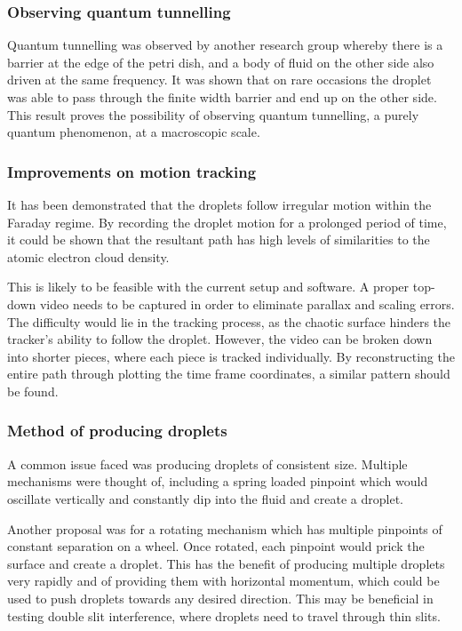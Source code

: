 \subsubsection{Observing quantum tunnelling}
Quantum tunnelling was observed by another research group \cite{brady2014bouncing} whereby there is a barrier at the edge of the petri dish, and a body of fluid on the other side also driven at the same frequency. It was shown that on rare occasions the droplet was able to pass through the finite width barrier and end up on the other side. This result proves the possibility of observing quantum tunnelling, a purely quantum phenomenon, at a macroscopic scale.

\subsubsection{Improvements on motion tracking}
It has been demonstrated that the droplets follow irregular motion within the Faraday regime. By recording the droplet motion for a prolonged period of time, it could be shown that the resultant path has high levels of similarities to the atomic electron cloud density. 

This is likely to be feasible with the current setup and software. A proper top-down video needs to be captured in order to eliminate parallax and scaling errors. The difficulty would lie in the tracking process, as the chaotic surface hinders the tracker's ability to follow the droplet. However, the video can be broken down into shorter pieces, where each piece is tracked individually. By reconstructing the entire path through plotting the time frame coordinates, a similar pattern should be found.

\subsubsection{Method of producing droplets}
A common issue faced was producing droplets of consistent size. Multiple mechanisms were thought of, including a spring loaded pinpoint which would oscillate vertically and constantly dip into the fluid and create a droplet.

Another proposal was for a rotating mechanism which has multiple pinpoints of constant separation on a wheel. Once rotated, each pinpoint would prick the surface and create a droplet. This has the benefit of producing multiple droplets very rapidly and of providing them with horizontal momentum, which could be used to push droplets towards any desired direction. This may be beneficial in testing double slit interference, where droplets need to travel through thin slits.

